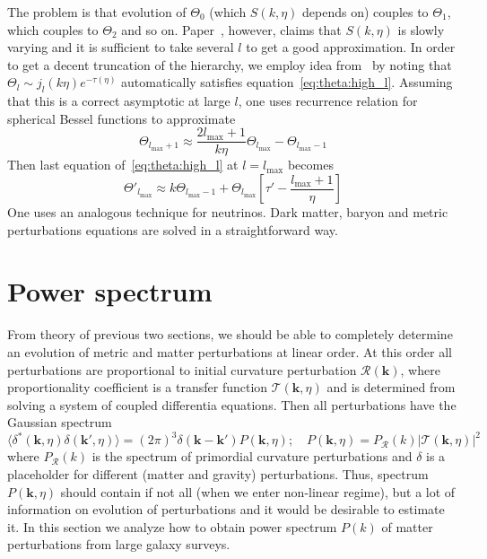 \documentclass[12pt]{extarticle}
\numberwithin{problem}{section}
\numberwithin{theorem}{section}
\begin{document}
	The problem is that evolution of $\Theta_0$ (which $S(k, \eta)$ depends on) couples to $\Theta_1$, which couples to $\Theta_2$ and so on. Paper~\cite{seljak:1996}, however, claims that $S(k, \eta)$ is slowly varying and it is sufficient to take several $l$ to get a good approximation. In order to get a decent truncation of the hierarchy, we employ idea from~\cite{ma:1995} by noting that $\Theta_l\sim j_l(k\eta)e^{-\tau(\eta)}$ automatically satisfies equation~\ref{eq:theta:high_l}. Assuming that this is a correct asymptotic at large $l$, one uses recurrence relation for spherical Bessel functions to approximate
	\begin{equation}
		\Theta_{l_{\max} + 1}\approx \frac{2l_{\max} + 1}{k\eta}\Theta_{l_{\max}} - \Theta_{l_{\max} - 1}
	\end{equation}
	Then last equation of~\ref{eq:theta:high_l} at $l = l_{\max}$ becomes
	\begin{equation}
		\Theta'_{l_{\max}}\approx k\Theta_{l_{\max} - 1} + \Theta_{l_{\max}}\left[\tau' - \frac{l_{\max} + 1}{\eta}\right]
	\end{equation}
	One uses an analogous technique for neutrinos. Dark matter, baryon and metric perturbations equations are solved in a straightforward way.
	
	\section{Power spectrum}
	From theory of previous two sections, we should be able to completely determine an evolution of metric and matter perturbations at linear order. At this order all perturbations are proportional to initial curvature perturbation $\mathcal{R}(\mathbf{k})$, where proportionality coefficient is a transfer function $\mathcal{T}(\mathbf{k}, \eta)$ and is determined from solving a system of coupled differentia equations. Then all perturbations have the Gaussian spectrum
	\begin{equation}
		\langle\delta^*(\mathbf{k}, \eta)\delta(\mathbf{k}', \eta)\rangle = (2\pi)^3\delta(\mathbf{k} - \mathbf{k}')P(\mathbf{k}, \eta);\quad P(\mathbf{k}, \eta) = P_{\mathcal{R}}(k)|\mathcal{T}(\mathbf{k}, \eta)|^2
	\end{equation}
	where $P_{\mathcal{R}}(k)$ is the spectrum of primordial curvature perturbations and $\delta$ is a placeholder for different (matter and gravity) perturbations. Thus, spectrum $P(\mathbf{k}, \eta)$ should contain if not all (when we enter non-linear regime), but a lot of information on evolution of perturbations and it would be desirable to estimate it. In this section we analyze how to obtain power spectrum $P(k)$ of matter perturbations from large galaxy surveys.
	
\end{document}
